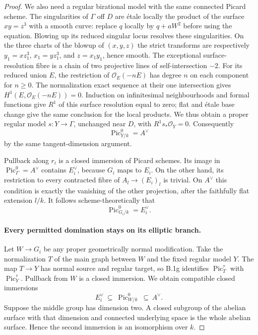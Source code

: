 \begin{proof}
We also need a regular birational model with the same connected
Picard scheme.  The singularities of $\Gamma$ off $D$ are
\'etale locally the product of the surface
$xy=z^3$ with a smooth curve: replace $q$ locally by
$q+aW^2$ before using the equation.  Blowing up its reduced singular
locus resolves these singularities.  On the three charts of
the blowup of $(x,y,z)$ the strict transforms are respectively
$y_1=xz_1^3$, $x_1=yz_1^3$, and $z=x_1y_1$, hence smooth.
The exceptional surface-resolution fibre is a chain of two
projective lines of self-intersection $-2$.
For its reduced union $E$, the restriction of
$\mathcal O_E(-nE)$ has degree $n$ on each component for
$n\ge0$.  The normalization exact sequence at their one
intersection gives $H^1(E,\mathcal O_E(-nE))=0$.
Induction on infinitesimal neighbourhoods and formal functions
give $R^1$ of this surface resolution equal to zero; flat and
\'etale base change give the same conclusion for the local
products.  We thus obtain a proper regular model
$s:Y\to\Gamma$, unchanged near $D$, with
$R^1s_*\mathcal O_Y=0$.  Consequently
\[
                    \operatorname{Pic}^0_{Y/k}=A^\vee
                    \tag{B.2.11}
\]
by the same tangent-dimension argument.

Pullback along $r_i$ is a closed immersion of Picard schemes.
Its image in $\operatorname{Pic}^0_\Gamma=A^\vee$ contains
$E_i^\vee$, because $G_i$ maps to $E_i$.  On the other hand,
its restriction to every contracted fibre of
$A_l\to(E_i)_l$ is trivial.  On $A^\vee$ this condition is
exactly the vanishing of the other projection, after the
faithfully flat extension $l/k$.  It follows scheme-theoretically
that
\[
                    \operatorname{Pic}^0_{G_i/k}=E_i^\vee.
                    \tag{B.2.12}
\]

\paragraph{Every permitted domination stays on its elliptic branch.}
Let $W\to G_i$ be any proper geometrically normal modification.
Take the normalization $T$ of the main graph between $W$ and
the fixed regular model $Y$.  The map $T\to Y$ has normal
source and regular target, so B.1g identifies
$\operatorname{Pic}^{\tau}_T$ with
$\operatorname{Pic}^{\tau}_Y$.  Pullback from $W$ is a closed
immersion.  We obtain compatible closed immersions
\[
       E_i^\vee\ \subseteq\ \operatorname{Pic}^0_{W/k}
              \ \subseteq\ A^\vee.                 \tag{B.2.13}
\]
Suppose the middle group has dimension two.  A closed subgroup
of the abelian surface with that dimension and connected
underlying space is the whole abelian surface.  Hence the
second immersion is an isomorphism over $k$.


\end{proof}
